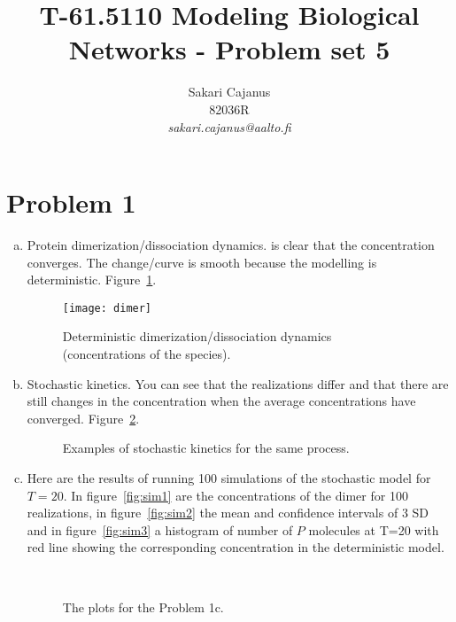 \documentclass[a4paper]{article}
\title{T-61.5110 Modeling Biological Networks - Problem set 5}
\author{Sakari Cajanus\\ 82036R \\
       {\it sakari.cajanus@aalto.fi}}
\begin{document}
\maketitle


\newpage

\section*{Problem 1}
\begin{enumerate}[a.]
    \item Protein dimerization/dissociation dynamics. is clear that the
        concentration converges. The change/curve is smooth because the
        modelling is deterministic. Figure~\ref{fig:dimer}.
        \begin{figure}[ht!]
    \begin{center}
        \texttt{[image: dimer]}
        \caption{Deterministic dimerization/dissociation dynamics
        (concentrations of the species).}
        \label{fig:dimer}
    \end{center}
\end{figure}
\item Stochastic kinetics. You can see that the realizations differ and that
    there are still changes in the concentration when the average
    concentrations have converged. Figure~\ref{fig:stoch}.
\begin{figure}[htp]
  \centering
  \caption{Examples of stochastic kinetics for the same process.}\label{fig:stoch}
\end{figure}
\item Here are the results of running 100 simulations of the stochastic model
    for $T=20$. In figure~\ref{fig:sim1} are the concentrations of the dimer
    for 100 realizations, in figure~\ref{fig:sim2} the mean and confidence
    intervals of 3 SD and in figure~\ref{fig:sim3} a histogram of number of
    $P$ molecules at T=20 with red line showing the corresponding
    concentration in the deterministic model.
    \begin{figure}[htp]
  \centering

  \\
  \caption{The plots for the Problem 1c.}\label{fig:sim}
  
\end{figure}
\end{enumerate}
\clearpage
\end{document}
